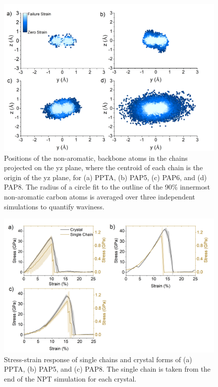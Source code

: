 \documentclass[journal=langd5,manuscript=article]{achemso}
\begin{document}
\begin{figure}[h!]
\centering
\includegraphics[scale=0.55]{Figure S1 sideviews.png}
\caption{Positions of the non-aromatic, backbone atoms in the chains projected on the yz plane, where the centroid of each chain is the origin of the yz plane, for (a) PPTA, (b) PAP5, (c) PAP6, and (d) PAP8. The radius of a circle fit to the outline of the 90\% innermost non-aromatic carbon atoms is averaged over three independent simulations to quantify waviness. 
}
\label{fig:sideviews}
\end{figure}

\begin{figure}[h!]
\centering
\includegraphics[scale=0.55]{Figure S2 SingleAndCrystal-PPTA-PAP5-PAP8.png}
\caption{Stress-strain response of single chains and crystal forms of (a) PPTA, (b) PAP5, and (c) PAP8. The single chain is taken from the end of the NPT simulation for each crystal.
}
\label{fig:SingleAndCrystal-PPTA-PAP5-PAP8}
\end{figure}
\end{document}

